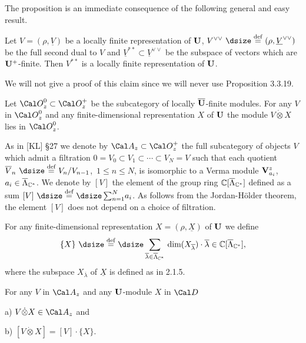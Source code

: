   The proposition is an immediate consequence of the
following general and easy result.
\enddemo

  Let  $V = (\rho, \underline{V})$  be a locally finite
representation
of ${\bold U}$, $V^{\vee\vee}\ {\dsize\buildrel{\text{def}}\over =}\ (\rho,
\underline{V}^{\vee\vee})$  be the full second dual to $V$ and
$\underline{V}^{**} \subset \underline{V}^{\vee\vee}$  be the subspace of
vectors which are ${\bold U}^+$-finite.  Then  $V^{**}$  is a locally finite
representation of ${\bold U}$.
\enddemo

We will not give a proof of this claim since we will never use Proposition
3.3.19.

  Let  ${\Cal O}^0_z \subset {\Cal O}^+_z$
be the subcategory of locally  $\overline{{\bold U}}$-finite modules.   For any
$V$
in ${\Cal O}^0_z$  and any finite-dimensional representation $X$ of ${\bold U}$
the module  $V \dot{\otimes} X$  lies in ${\Cal O}^0_z$.
\endproclaim

  As in [KL] \S27 we denote by  ${\Cal A}_z \subset
{\Cal O}^+_z$  the full subcategory of objects $V$ which admit a filtration
$0 = V_0 \subset V_1 \subset \cdots \subset V_N = V$  such that each quotient
$\overline{V}_n\ {\dsize\buildrel{\text{def}}\over =}\ V_n/V_{n-1}$,\
$1 \le n \le N$, is isomorphic to a Verma module  ${\bold V}^z_{a_i}$,
$a_i \in \overline{\Lambda}_{{\Bbb C}^*}$.  We denote by  $[V]$  the element
of the group ring  ${\Bbb C}[\overline{\Lambda}_{{\Bbb C}^*}]$  defined as a
sum $[V]\ {\dsize\buildrel{\text{def}}\over =}\ {\dsize\sum^N_{n=1}} a_i$.
As follows from the Jordan-H\"older theorem, the element $[V]$  does not
depend on a choice of filtration.


  For any finite-dimensional representation $X = (\rho,
\underline{X})$ of ${\bold U}$  we define
$$
\{ X\}\ {\dsize\buildrel{\text{def}}\over =}\
{\dsize\sum_{\overline{\lambda}\in \overline{\Lambda}_{{\Bbb C}^*}}}\
\text{dim}(X_{\overline \lambda}) \cdot {\overline \lambda} \in
{\Bbb C}[\overline{\Lambda}_{{\Bbb C}^*}] ,
$$
where the subspace  $X_{\overline{\lambda}}$  of  $\underline{X}$  is defined
as in 2.1.5.

\proclaim{Proposition}  For any $V$ in ${\Cal A}_z$  and any
${\bold U}$-module $X$ in ${\Cal D}$

a)   $V \dot{\otimes} X \in {\Cal A}_z$  and

b)   $[V \dot{\otimes} X] =   [V] \cdot \{ X\}$.
\endproclaim

